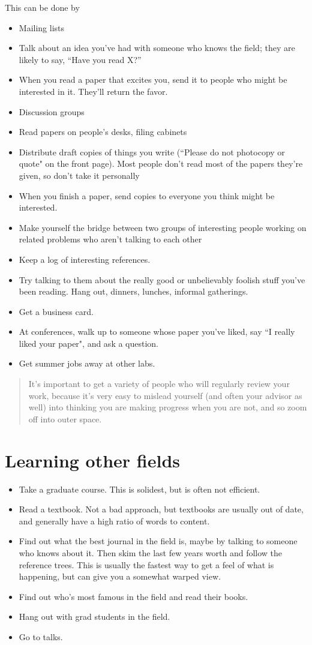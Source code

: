 This can be done by
\begin{itemize}
\item Mailing lists
\item Talk about an idea you’ve had with someone who knows the
field; they are likely to say, “Have you read X?” 
\item When you read a paper that excites you, send it to people who might be
interested in it. They'll return the favor.
\item Discussion groups
\item Read papers on people's desks, filing cabinets
\item Distribute draft copies of things you write (``Please do not photocopy or
quote" on the front page). Most people don’t read most of the papers they’re
given, so don’t take it personally
\item When you finish a paper, send copies to everyone you think might be
interested.
\item Make yourself the bridge between two groups of
interesting people working on related problems who aren’t talking to each
other
\item Keep a log of interesting references.
\item Try talking to them about the really good or unbelievably foolish stuff
you’ve been reading. Hang out, dinners, lunches, informal gatherings.
\item Get a business card.
\item At conferences, walk up to someone whose paper you’ve liked, say ``I really
liked your paper", and ask a question.
\item Get summer jobs away at other labs.
\end{itemize}

\blockquote{It’s important to get a variety of people who will regularly review
your work, because it's very easy to mislead yourself (and often your advisor as
well) into thinking you are making progress when you are not, and so zoom off
into outer space.}

\section{Learning other fields}
\begin{itemize}
\item Take a graduate course. This is solidest, but is often not efficient.
\item Read a textbook. Not a bad approach, but textbooks are usually out of date, and generally have a high ratio of words to content.
\item Find out what the best journal in the field is, maybe by talking to someone who knows about it. Then skim the last few years worth and follow the reference trees. This is usually the fastest way to get a feel of what is happening, but can give you a somewhat warped view.
\item Find out who’s most famous in the field and read their books.
\item Hang out with grad students in the field.
\item Go to talks. 
\end{itemize}

